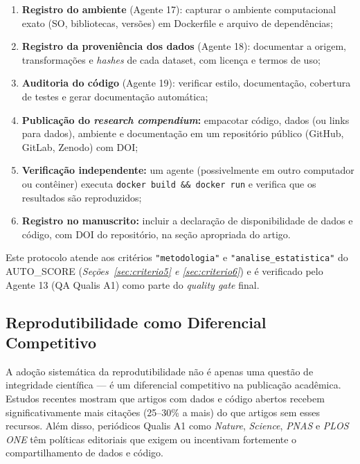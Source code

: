 \begin{enumerate}
    \item \textbf{Registro do ambiente} (Agente 17): capturar o
    ambiente computacional exato (SO, bibliotecas, versões) em
    Dockerfile e arquivo de dependências;

    \item \textbf{Registro da proveniência dos dados} (Agente 18):
    documentar a origem, transformações e \textit{hashes} de cada
    dataset, com licença e termos de uso;

    \item \textbf{Auditoria do código} (Agente 19): verificar
    estilo, documentação, cobertura de testes e gerar documentação
    automática;

    \item \textbf{Publicação do \textit{research compendium}:}
    empacotar código, dados (ou links para dados), ambiente e
    documentação em um repositório público (GitHub, GitLab, Zenodo)
    com DOI;

    \item \textbf{Verificação independente:} um agente
    (possivelmente em outro computador ou contêiner) executa
    \texttt{docker build \&\& docker run} e verifica que os
    resultados são reproduzidos;

    \item \textbf{Registro no manuscrito:} incluir a declaração de
    disponibilidade de dados e código, com DOI do repositório, na
    seção apropriada do artigo.
\end{enumerate}

Este protocolo atende aos critérios \texttt{"metodologia"} e
\texttt{"analise\_estatistica"} do AUTO\_SCORE
(\textit{Seções~\ref{sec:criterio5} e \ref{sec:criterio6}}) e é
verificado pelo Agente 13 (QA Qualis A1) como parte do
\textit{quality gate} final.

\subsection{Reprodutibilidade como Diferencial Competitivo}
\label{sec:diferencial_reprodutibilidade}

A adoção sistemática da reprodutibilidade não é apenas uma questão
de integridade científica — é um diferencial competitivo na
publicação acadêmica. Estudos recentes
\cite{Piwowar2007_DataSharing, McKiernan2016_OpenScience} mostram
que artigos com dados e código abertos recebem significativamente
mais citações (25--30\% a mais) do que artigos sem esses recursos.
Além disso, periódicos Qualis A1 como \textit{Nature}, \textit{Science},
\textit{PNAS} e \textit{PLOS ONE} têm políticas editoriais que exigem
ou incentivam fortemente o compartilhamento de dados e código.


